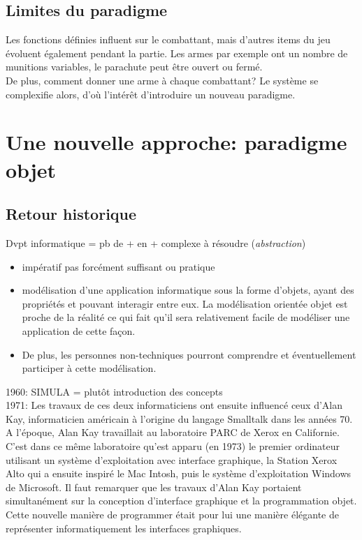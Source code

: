 \documentclass[a4paper,11pt]{article}
\begin{document}
\begin{Form}
\begin{commentprof}
\subsection*{Limites du paradigme}
Les fonctions définies influent sur le combattant, mais d'autres items du jeu évoluent également pendant la partie. Les armes par exemple ont un nombre de munitions variables, le parachute peut être ouvert ou fermé.\\De plus, comment donner une arme à chaque combattant? Le système se complexifie alors, d'où l'intérêt d'introduire un nouveau paradigme.
\end{commentprof}
\section{Une nouvelle approche: paradigme objet}
\begin{commentprof}
\subsection*{Retour historique}
Dvpt informatique = pb de + en + complexe à résoudre (\emph{abstraction})
\begin{itemize}
\item impératif pas forcément suffisant ou pratique
\item modélisation d'une application informatique sous la forme d’objets, ayant des propriétés et pouvant interagir entre eux. La modélisation orientée objet est proche de la réalité ce qui fait qu’il sera relativement facile de modéliser une application de cette façon.
\item De plus, les personnes non-techniques pourront comprendre et éventuellement participer à cette modélisation.
\end{itemize}
1960: SIMULA = plutôt introduction des concepts\\
1971: Les travaux de ces deux informaticiens ont ensuite influencé ceux d'Alan Kay, informaticien américain à l'origine du langage Smalltalk dans les années 70. A l'époque, Alan Kay travaillait au laboratoire PARC de Xerox en Californie. C'est dans ce même laboratoire qu'est apparu (en 1973) le premier ordinateur utilisant un système d'exploitation avec interface graphique, la Station Xerox Alto qui a ensuite inspiré le Mac Intosh, puis le système d'exploitation Windows de Microsoft. Il faut remarquer que les travaux d'Alan Kay portaient simultanément sur la conception d'interface graphique et la programmation objet. Cette nouvelle manière de programmer était pour lui une manière élégante de représenter informatiquement les interfaces graphiques. 
\end{commentprof}

\end{Form}
\end{document}
